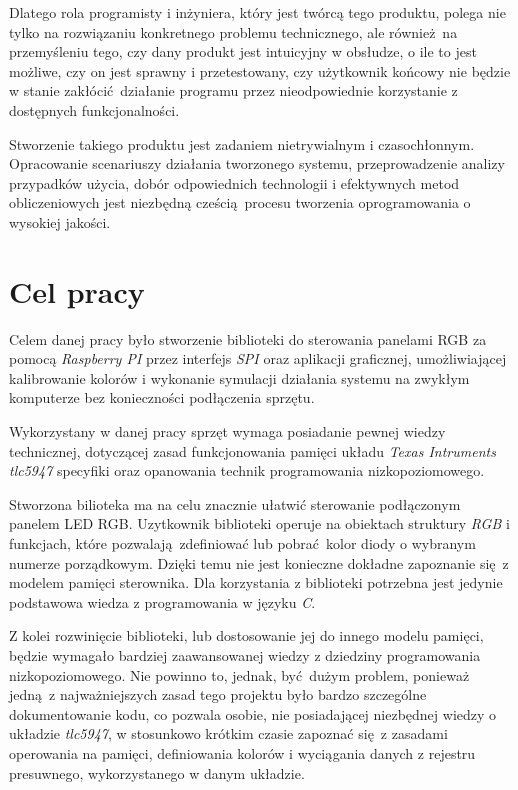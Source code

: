 \documentclass[eng,printmode]{mgr}
\begin{document}
Dlatego rola programisty i inżyniera, który jest twórcą tego produktu, polega nie tylko na rozwiązaniu konkretnego problemu technicznego, ale również na przemyśleniu tego, czy dany produkt jest intuicyjny w obsłudze, o ile to jest możliwe, czy on jest sprawny i przetestowany, czy użytkownik końcowy nie będzie w stanie zakłócić działanie programu przez nieodpowiednie korzystanie z dostępnych funkcjonalności.

Stworzenie takiego produktu jest zadaniem nietrywialnym i czasochłonnym. Opracowanie scenariuszy działania tworzonego systemu, przeprowadzenie analizy przypadków użycia, dobór odpowiednich technologii i efektywnych metod obliczeniowych jest niezbędną cześcią procesu tworzenia oprogramowania o wysokiej jakości.

\chapter{Cel pracy}

Celem danej pracy było stworzenie biblioteki do sterowania panelami RGB za pomocą \emph{Raspberry PI} przez interfejs \emph{SPI} oraz aplikacji graficznej, umożliwiającej kalibrowanie kolorów i wykonanie symulacji działania systemu na zwykłym komputerze bez konieczności podłączenia sprzętu. 

Wykorzystany w danej pracy sprzęt wymaga posiadanie pewnej wiedzy technicznej, dotyczącej zasad funkcjonowania pamięci układu \emph{Texas Intruments tlc5947} specyfiki oraz opanowania technik programowania nizkopoziomowego. 

Stworzona bilioteka ma na celu znacznie ułatwić sterowanie podłączonym panelem LED RGB. Uzytkownik biblioteki operuje na obiektach struktury \emph{RGB} i funkcjach, które pozwalają zdefiniować lub pobrać kolor diody o wybranym numerze porządkowym. Dzięki temu nie jest konieczne dokładne zapoznanie się z modelem pamięci sterownika. Dla korzystania z biblioteki potrzebna jest jedynie podstawowa wiedza z programowania w języku \emph{C}. 

Z kolei rozwinięcie biblioteki, lub dostosowanie jej do innego modelu pamięci, będzie wymagało bardziej zaawansowanej wiedzy z dziedziny programowania nizkopoziomowego. Nie powinno to, jednak, być dużym problem, ponieważ jedną z najważniejszych zasad tego projektu było bardzo szczególne dokumentowanie kodu, co pozwala osobie, nie posiadającej niezbędnej wiedzy o układzie \emph{tlc5947}, w stosunkowo krótkim czasie zapoznać się z zasadami operowania na pamięci, definiowania kolorów i wyciągania danych z rejestru presuwnego, wykorzystanego w danym układzie.
\end{document}
